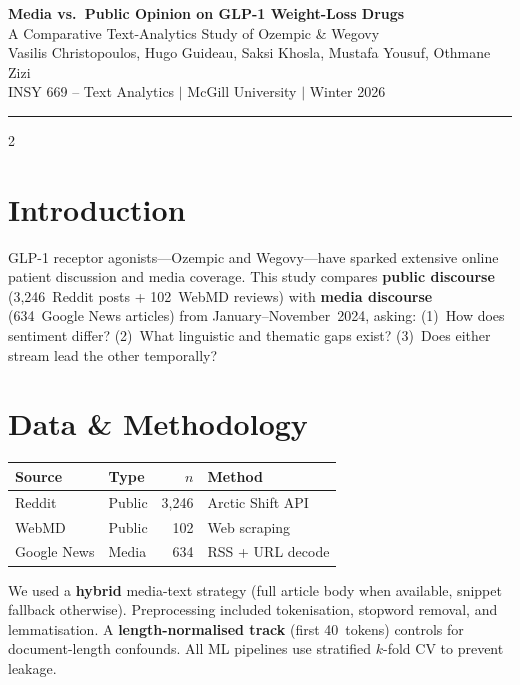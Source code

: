 \documentclass[10pt,a4paper]{article}
\begin{document}
\begin{center}
{\large\bfseries Media vs.\ Public Opinion on GLP-1 Weight-Loss Drugs}\\[2pt]
{\small A Comparative Text-Analytics Study of Ozempic \& Wegovy}\\[2pt]
{\footnotesize Vasilis Christopoulos, Hugo Guideau, Saksi Khosla, Mustafa Yousuf, Othmane Zizi\\
INSY 669 -- Text Analytics $\mid$ McGill University $\mid$ Winter 2026}
\end{center}
\vspace{-2pt}
\hrule
\vspace{4pt}

\begin{multicols}{2}

\section{Introduction}

GLP-1 receptor agonists---Ozempic and Wegovy---have sparked extensive online patient discussion and media coverage.  This study compares \textbf{public discourse} (3,246~Reddit posts + 102~WebMD reviews) with \textbf{media discourse} (634~Google News articles) from January--November~2024, asking: (1)~How does sentiment differ? (2)~What linguistic and thematic gaps exist? (3)~Does either stream lead the other temporally?

\section{Data \& Methodology}

\begin{table}[H]
\centering\small
\begin{tabular}{llrl}
\toprule
\textbf{Source} & \textbf{Type} & $n$ & \textbf{Method}\\
\midrule
Reddit & Public & 3,246 & Arctic Shift API\\
WebMD & Public & 102 & Web scraping\\
Google News & Media & 634 & RSS + URL decode\\
\bottomrule
\end{tabular}
\end{table}
\vspace{-6pt}

We used a \textbf{hybrid} media-text strategy (full article body when available, snippet fallback otherwise).  Preprocessing included tokenisation, stopword removal, and lemmatisation.  A \textbf{length-normalised track} (first 40~tokens) controls for document-length confounds.  All ML pipelines use stratified $k$-fold CV to prevent leakage.


\end{multicols}
\end{document}

